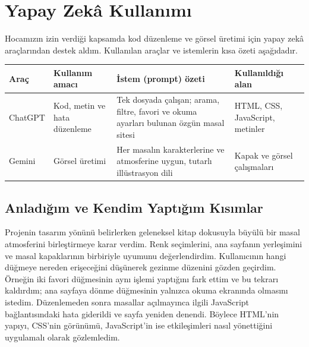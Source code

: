 \documentclass[10pt,a4paper]{article}
\begin{document}
\section{Yapay Zekâ Kullanımı}
Hocamızın izin verdiği kapsamda kod düzenleme ve görsel üretimi için yapay zekâ araçlarından destek aldım. Kullanılan araçlar ve istemlerin kısa özeti aşağıdadır.
\par\medskip\noindent\begin{tabularx}{\textwidth}{@{}p{}p{}Xp{}@{}}\toprule Araç & Kullanım amacı & İstem (prompt) özeti & Kullanıldığı alan \\ \midrule
ChatGPT & Kod, metin ve hata düzenleme & Tek dosyada çalışan; arama, filtre, favori ve okuma ayarları bulunan özgün masal sitesi & HTML, CSS, JavaScript, metinler \\
Gemini & Görsel üretimi & Her masalın karakterlerine ve atmosferine uygun, tutarlı illüstrasyon dili & Kapak ve görsel çalışmaları \\
\bottomrule\end{tabularx}
\subsection{Anladığım ve Kendim Yaptığım Kısımlar}
Projenin tasarım yönünü belirlerken geleneksel kitap dokusuyla büyülü bir masal atmosferini birleştirmeye karar verdim. Renk seçimlerini, ana sayfanın yerleşimini ve masal kapaklarının birbiriyle uyumunu değerlendirdim. Kullanıcının hangi düğmeye nereden erişeceğini düşünerek gezinme düzenini gözden geçirdim. Örneğin iki favori düğmesinin aynı işlemi yaptığını fark ettim ve bu tekrarı kaldırdım; ana sayfaya dönme düğmesinin yalnızca okuma ekranında olmasını istedim. Düzenlemeden sonra masallar açılmayınca ilgili JavaScript bağlantısındaki hata giderildi ve sayfa yeniden denendi. Böylece HTML'nin yapıyı, CSS'nin görünümü, JavaScript'in ise etkileşimleri nasıl yönettiğini uygulamalı olarak gözlemledim.
\end{document}

